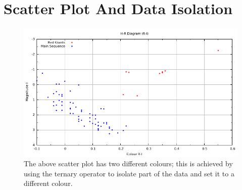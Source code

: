 \documentclass[10pt,a4paper,final]{report}
\begin{document}
\section{Scatter Plot And Data Isolation}
\begin{figure}[!hbtp]
\centering
\includegraphics[width=\textwidth]{../CodeLisa/RIHRdiagram/RIHR.pdf}
\caption{The above scatter plot has two different colours; this is achieved by using the ternary operator to isolate part of the data and set it to a different colour.}
\end{figure}

\end{document}
